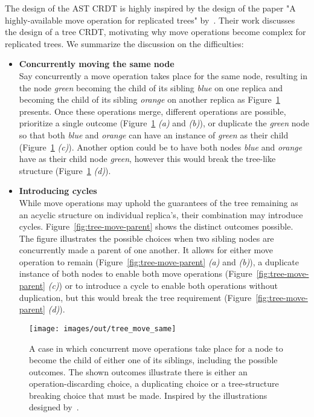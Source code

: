 The design of the AST CRDT is highly inspired by the design of the paper "A highly-available move operation for
replicated trees" by~\citet{9563274}.
Their work discusses the design of a tree CRDT, motivating why move operations become complex for replicated trees.
We summarize the discussion on the difficulties:

\begin{itemize}
    \item \textbf{Concurrently moving the same node} \\
    Say concurrently a move operation takes place for the same node, resulting in the node \emph{green} becoming the
    child of its sibling \emph{blue} on one replica and becoming the child of its sibling \emph{orange} on another
    replica as Figure~\ref{fig:tree-move-same} presents.
    Once these operations merge, different operations are possible, prioritize a single outcome
    (Figure~\ref{fig:tree-move-same} \emph{(a)} and \emph{(b)}), or duplicate the \emph{green} node so that both
    \emph{blue} and \emph{orange} can have an instance of \emph{green} as their child
    (Figure~\ref{fig:tree-move-same} \emph{(c)}).
    Another option could be to have both nodes \emph{blue} and \emph{orange} have as their child node \emph{green},
    however this would break the tree-like structure (Figure~\ref{fig:tree-move-same} \emph{(d)}).

    \item \textbf{Introducing cycles} \\
    While move operations may uphold the guarantees of the tree remaining as an acyclic structure on individual
    replica's, their combination may introduce cycles.
    Figure~\ref{fig:tree-move-parent} shows the distinct outcomes possible.
    The figure illustrates the possible choices when two sibling nodes are concurrently made a parent of one another.
    It allows for either move operation to remain (Figure~\ref{fig:tree-move-parent} \emph{(a)} and \emph{(b)}), a
    duplicate instance of both nodes to enable both move operations (Figure~\ref{fig:tree-move-parent} \emph{(c)}) or
    to introduce a cycle to enable both operations without duplication, but this would break the tree requirement
    (Figure~\ref{fig:tree-move-parent} \emph{(d)}).
\end{itemize}

\begin{figure}
    \centering
    \texttt{[image: images/out/tree\_move\_same]}
    \caption{
        A case in which concurrent move operations take place for a node to become the child of either one of its
        siblings, including the possible outcomes.
        The shown outcomes illustrate there is either an operation-discarding choice, a duplicating choice or a
        tree-structure breaking choice that must be made.
        Inspired by the illustrations designed by~\citet{9563274}.
    }
    \label{fig:tree-move-same}
\end{figure}

